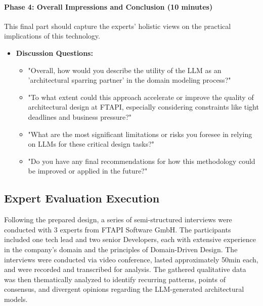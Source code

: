 \paragraph{Phase 4: Overall Impressions and Conclusion (10 minutes)}
This final part should capture the experts' holistic views on the practical implications of this technology.

\begin{itemize}
    \item \textbf{Discussion Questions:}
    \begin{itemize}
        \item "Overall, how would you describe the utility of the LLM as an 'architectural sparring partner' in the domain modeling process?"
        \item "To what extent could this approach accelerate or improve the quality of architectural design at FTAPI, especially considering constraints like tight deadlines and business pressure?"
        \item "What are the most significant limitations or risks you foresee in relying on LLMs for these critical design tasks?"
        \item "Do you have any final recommendations for how this methodology could be improved or applied in the future?"
    \end{itemize}
\end{itemize}

\subsection{Expert Evaluation Execution}
Following the prepared design, a series of semi-structured interviews were conducted with 3 experts from FTAPI Software GmbH. The participants included one tech lead and two senior Developers, each with extensive experience in the company's domain and the principles of Domain-Driven Design. The interviews were conducted via video conference, lasted approximately 50min each, and were recorded and transcribed for analysis. The gathered qualitative data was then thematically analyzed to identify recurring patterns, points of consensus, and divergent opinions regarding the LLM-generated architectural models.